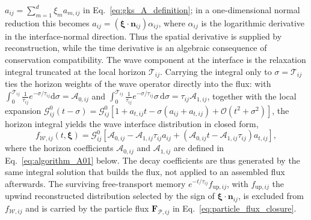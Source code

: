 \documentclass[preprint,12pt]{elsarticle}
\begin{document}
$a_{ij}=\sum_{m=1}^{d}\xi_m a_{m,ij}$ in Eq.~\eqref{eq:gks_A_definition}; in a one-dimensional normal reduction this becomes $a_{ij}=(\boldsymbol{\xi}\cdot\boldsymbol{n}_{ij})\alpha_{ij}$, where $\alpha_{ij}$ is the logarithmic derivative in the interface-normal direction. Thus the spatial derivative is supplied by reconstruction, while the time derivative is an algebraic consequence of conservation compatibility. The wave component at the interface is the relaxation integral truncated at the local horizon $\mathcal{T}_{ij}$. Carrying the integral only to $\sigma=\mathcal{T}_{ij}$ ties the horizon weights of the wave operator directly into the flux: with $\int_0^{\mathcal{T}_{ij}}\tfrac{1}{\tau_{ij}}e^{-\sigma/\tau_{ij}}\mathrm{d}\sigma=\mathcal A_{0,ij}$ and $\int_0^{\mathcal{T}_{ij}}\tfrac{1}{\tau_{ij}}e^{-\sigma/\tau_{ij}}\sigma\,\mathrm{d}\sigma=\tau_{ij}\mathcal A_{1,ij}$, together with the local expansion $\mathcal{G}_{ij}^{0}(t-\sigma)=\mathcal{G}_{ij}^{0}[1+a_{t,ij}t-\sigma(a_{ij}+a_{t,ij})+\mathcal O(t^2+\sigma^2)]$, the horizon integral yields the wave interface distribution in closed form,
\begin{equation}\label{eq:wave_interface_distribution}
    f_{\mathcal{W},ij}(t,\boldsymbol{\xi})
    =
    \mathcal{G}_{ij}^{0}\left[
    \mathcal A_{0,ij}
    -\mathcal A_{1,ij}\tau_{ij}a_{ij}
    +
    \left(\mathcal A_{0,ij}t-\mathcal A_{1,ij}\tau_{ij}\right)a_{t,ij}
    \right],
\end{equation}
where the horizon coefficients $\mathcal A_{0,ij}$ and $\mathcal A_{1,ij}$ are defined in Eq.~\eqref{eq:algorithm_A01} below. The decay coefficients are thus generated by the same integral solution that builds the flux, not applied to an assembled flux afterwards. The surviving free-transport memory $e^{-t/\tau_{ij}}f_{\mathrm{up},ij}$, with $f_{\mathrm{up},ij}$ the upwind reconstructed distribution selected by the sign of $\boldsymbol{\xi}\cdot\boldsymbol{n}_{ij}$, is excluded from $f_{\mathcal{W},ij}$ and is carried by the particle flux $\mathbf F_{\mathcal{P},ij}$ in Eq.~\eqref{eq:particle_flux_closure}.
\end{document}
